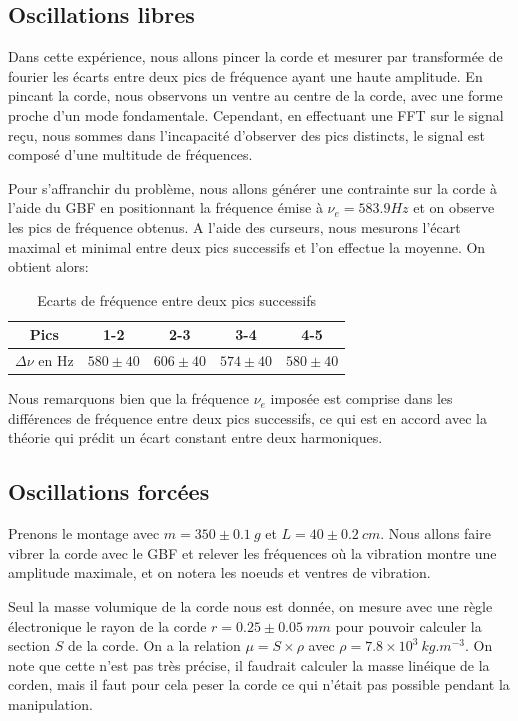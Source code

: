 \documentclass[11pt]{article}
\begin{document}
\subsection{Oscillations libres}
Dans cette expérience, nous allons pincer la corde et mesurer par transformée de fourier les écarts entre deux pics de fréquence ayant une haute amplitude.
En pincant la corde, nous observons un ventre au centre de la corde, avec une forme proche d'un mode fondamentale. Cependant, en effectuant une FFT sur le signal reçu,
nous sommes dans l'incapacité d'observer des pics distincts, le signal est composé d'une multitude de fréquences.

Pour s'affranchir du problème, nous allons générer une contrainte sur la corde à l'aide du GBF en positionnant la fréquence émise à $\nu_e = 583.9 Hz$ et on observe
les pics de fréquence obtenus. A l'aide des curseurs, nous mesurons l'écart maximal et minimal entre deux pics successifs et l'on effectue la moyenne. On obtient alors:

\begin{table}[h!]
	\centering
	\begin{tabular}{||c c c c c||} 
		\hline
		Pics & 1-2 & 2-3 & 3-4 & 4-5 \\
		\hline
        $\Delta \nu$ en Hz & $580 \pm 40$ & $606 \pm 40$ & $574 \pm 40$ & $580 \pm 40$ \\
		\hline
	\end{tabular}
	\caption{Ecarts de fréquence entre deux pics successifs}
	\label{table:1}
\end{table}

Nous remarquons bien que la fréquence $\nu_e$ imposée est comprise dans les différences de fréquence entre deux pics successifs, ce qui est en accord avec la théorie qui prédit 
un écart constant entre deux harmoniques.

\break
\subsection{Oscillations forcées}
Prenons le montage avec $m=350 \pm 0.1 \ g$ et $L=40 \pm 0.2 \ cm$. Nous allons faire vibrer la corde avec le GBF et relever les fréquences où la vibration montre une amplitude
maximale, et on notera les noeuds et ventres de vibration.

Seul la masse volumique de la corde nous est donnée, on mesure avec une règle électronique le rayon de la corde $r=0.25 \pm  0.05 \ mm$ pour pouvoir calculer la section $S$ de la corde. On a la relation $\mu= S \times \rho$ avec $\rho = 7.8 \times 10^3 \ kg.m^{-3}$.
On note que cette n'est pas très précise, il faudrait calculer la masse linéique de la corden, mais il faut pour cela peser la corde ce qui n'était pas possible pendant la manipulation.
\end{document}
